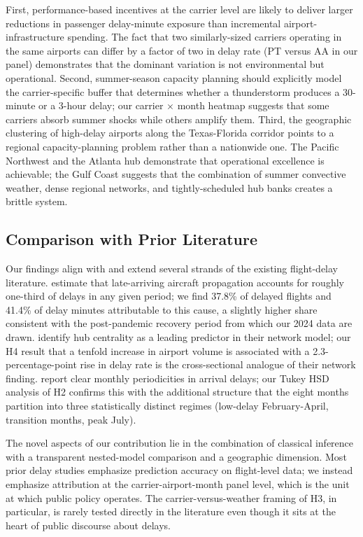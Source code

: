 \documentclass[12pt,letterpaper]{article}
\begin{document}
First, performance-based incentives at the carrier level are likely
to deliver larger reductions in passenger delay-minute exposure than
incremental airport-infrastructure spending. The fact that two
similarly-sized carriers operating in the same airports can differ
by a factor of two in delay rate (PT versus AA in our panel)
demonstrates that the dominant variation is not environmental but
operational. Second, summer-season capacity planning should
explicitly model the carrier-specific buffer that determines whether
a thunderstorm produces a 30-minute or a 3-hour delay; our
carrier $\times$ month heatmap suggests that some carriers absorb
summer shocks while others amplify them. Third, the geographic
clustering of high-delay airports along the Texas-Florida corridor
points to a regional capacity-planning problem rather than a
nationwide one. The Pacific Northwest and the Atlanta hub demonstrate
that operational excellence is achievable; the Gulf Coast suggests
that the combination of summer convective weather, dense regional
networks, and tightly-scheduled hub banks creates a brittle system.

\subsection{Comparison with Prior Literature}
Our findings align with and extend several strands of the existing
flight-delay literature. \citet{kafle2017} estimate that
late-arriving aircraft propagation accounts for roughly one-third of
delays in any given period; we find 37.8\% of delayed flights and
41.4\% of delay minutes attributable to this cause, a slightly
higher share consistent with the post-pandemic recovery period from
which our 2024 data are drawn. \citet{rebollo2014} identify hub
centrality as a leading predictor in their network model; our H4
result that a tenfold increase in airport volume is associated with
a 2.3-percentage-point rise in delay rate is the cross-sectional
analogue of their network finding. \citet{abdelghany2004} report
clear monthly periodicities in arrival delays; our Tukey HSD analysis
of H2 confirms this with the additional structure that the eight
months partition into three statistically distinct regimes
(low-delay February-April, transition months, peak July).

The novel aspects of our contribution lie in the combination of
classical inference with a transparent nested-model comparison and a
geographic dimension. Most prior delay studies emphasize prediction
accuracy on flight-level data; we instead emphasize attribution at
the carrier-airport-month panel level, which is the unit at which
public policy operates. The carrier-versus-weather framing of H3, in
particular, is rarely tested directly in the literature even though
it sits at the heart of public discourse about delays.
\end{document}
